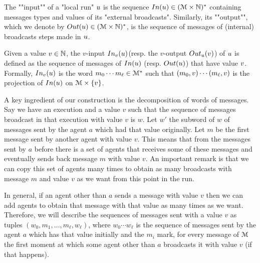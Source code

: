 \begin{definition}
	The ""input"" of a "local run" $u$ is the sequence $\Input{\localrun} \in (\messages \times \nats)^*$ containing messages types and values of its "external broadcasts".
	Similarly, its ""output"", which we denote by $\Output{\localrun} \in (\messages \times \nats)^*$, is the sequence of messages of (internal) broadcasts steps made in $u$.
	
	Given a value $v \in \mathbb{N} $, the $v$-input $\vinput{\aval}{\localrun} $(resp. the $v$-output $\voutput{\localrun}{\aval}$) of $u$ is defined as the sequence of messages of $\Input{\localrun}$ (resp. $\Output{\localrun}$) that have value $v$. Formally, $\vinput{\aval}{\localrun}$ is the word $m_0 \cdots m_{\ell} \in \mathcal{M}^*$ such that $(m_0, v) \cdots (m_{\ell}, v)$ is the projection of $\Input{\localrun}$ on $\mathcal{M} \times \{v\}$.  
	
	
	

\end{definition}

A key ingredient of our construction is the decomposition of words of messages. Say we have an execution and a value $v$ such that the sequence of messages broadcast in that execution with value $v$ is $w$. Let $w'$ the subword of $w$ of messages sent by the agent $a$ which had that value originally. Let $m$ be the first message sent by another agent with value $v$. This means that from the messages sent by $a$ before there is a set of agents that receives some of these messages and eventually sends back message $m$ with value $v$. An important remark is that we can copy this set of agents many times to obtain as many broadcasts with message $m$ and value $v$ as we want from this point in the run.

In general, if an agent other than $a$ sends a message with value $v$ then we can add agents to obtain that message with that value as many times as we want.
Therefore, we will describe the sequences of messages sent with a value $v$ as tuples $(w_0, m_1, \ldots, m_\ell, w_\ell)$, where $w_0 \cdots w_\ell$ is the sequence of messages sent by the agent $a$ which has that value initially and the $m_i$ mark, for every message of $\mathcal{M}$ the first moment at which some agent other than $a$ broadcasts it with value $v$ (if that happens).

